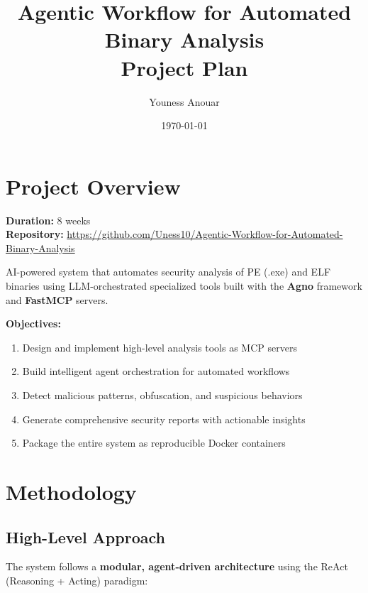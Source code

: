 \documentclass[11pt,a4paper]{article}
\title{
  \vspace{-1.5cm}
  \textbf{\Huge Agentic Workflow for Automated Binary Analysis}\\
  \vspace{0.3em}
  \Large\textcolor{muted}{Project Plan}
}
\author{Youness Anouar}
\date{\today}
\begin{document}
\maketitle
\vspace{-0.8cm}

\section{Project Overview}

\noindent\textbf{Duration:} 8 weeks \\ \textbf{Repository:} \url{https://github.com/Uness10/Agentic-Workflow-for-Automated-Binary-Analysis}

\vspace{0.4em}
\noindent AI-powered system that automates security analysis of PE (.exe) and ELF binaries using LLM-orchestrated specialized tools built with the \textbf{Agno} framework and \textbf{FastMCP} servers.

\vspace{0.4em}
\noindent\textbf{Objectives:}
\begin{enumerate}
  \item Design and implement high-level analysis tools as MCP servers
  \item Build intelligent agent orchestration for automated workflows
  \item Detect malicious patterns, obfuscation, and suspicious behaviors
  \item Generate comprehensive security reports with actionable insights
  \item Package the entire system as reproducible Docker containers
\end{enumerate}

\section{Methodology}

\subsection{High-Level Approach}
The system follows a \textbf{modular, agent-driven architecture} using the ReAct (Reasoning + Acting) paradigm:
\end{document}
